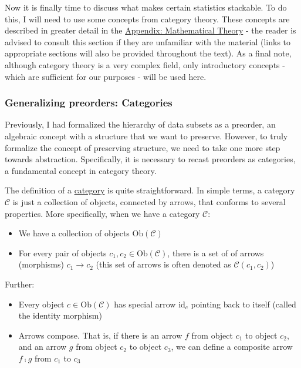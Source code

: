 \documentclass[
]{book}
\providecommand{\tightlist}{%
  \setlength{\itemsep}{0pt}\setlength{\parskip}{0pt}}
\theoremstyle{definition}
\theoremstyle{definition}
\theoremstyle{definition}
\theoremstyle{definition}
\theoremstyle{remark}
\begin{document}
Now it is finally time to discuss what makes certain statistics stackable. To do this, I will need to use some concepts from category theory. These concepts are described in greater detail in the \hyperref[mathematical-theory]{Appendix: Mathematical Theory} - the reader is advised to consult this section if they are unfamiliar with the material (links to appropriate sections will also be provided throughout the text). As a final note, although category theory is a very complex field, only introductory concepts - which are sufficient for our purposes - will be used here.

\subsubsection{Generalizing preorders: Categories}\label{preorders-categories}

Previously, I had formalized the hierarchy of data subsets as a preorder, an algebraic concept with a structure that we want to preserve. However, to truly formalize the concept of preserving structure, we need to take one more step towards abstraction. Specifically, it is necessary to recast preorders as categories, a fundamental concept in category theory.

The definition of a \hyperref[categories]{category} is quite straightforward. In simple terms, a category \(\mathcal{C}\) is just a collection of objects, connected by arrows, that conforms to several properties. More specifically, when we have a category \(\mathcal{C}\):

\begin{itemize}
\tightlist
\item
  We have a collection of objects \(\text{Ob}(\mathcal{C})\)
\item
  For every pair of objects \(c_1, c_2 \in \text{Ob}(\mathcal{C})\), there is a set of of arrows (morphisms) \(c_1 \to c_2\) (this set of arrows is often denoted as \(\mathcal{C}(c_1, c_2)\))
\end{itemize}

Further:

\begin{itemize}
\tightlist
\item
  Every object \(c \in \text{Ob}(\mathcal{C})\) has special arrow \(\text{id}_c\) pointing back to itself (called the identity morphism)
\item
  Arrows compose. That is, if there is an arrow \(f\) from object \(c_1\) to object \(c_2\), and an arrow \(g\) from object \(c_2\) to object \(c_3\), we can define a composite arrow \(f ⨾g\) from \(c_1\) to \(c_3\)
\end{itemize}
\end{document}
